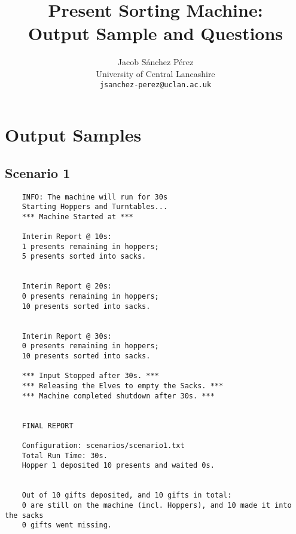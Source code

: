 \documentclass[a4paper,12pt]{article}
\title{Present Sorting Machine: \\Output Sample and Questions}
\author{Jacob Sánchez Pérez\\ University of Central Lancashire\\\texttt{jsanchez-perez@uclan.ac.uk}}
\date{}
\begin{document}
    \maketitle
    \section{Output Samples}
    
    \subsection{Scenario 1}
    
    \begin{verbatim}
    INFO: The machine will run for 30s
    Starting Hoppers and Turntables...
    *** Machine Started at ***

    Interim Report @ 10s:
    1 presents remaining in hoppers;
    5 presents sorted into sacks.


    Interim Report @ 20s:
    0 presents remaining in hoppers;
    10 presents sorted into sacks.


    Interim Report @ 30s:
    0 presents remaining in hoppers;
    10 presents sorted into sacks.

    *** Input Stopped after 30s. ***
    *** Releasing the Elves to empty the Sacks. ***
    *** Machine completed shutdown after 30s. ***


    FINAL REPORT

    Configuration: scenarios/scenario1.txt
    Total Run Time: 30s.
    Hopper 1 deposited 10 presents and waited 0s.


    Out of 10 gifts deposited, and 10 gifts in total:
    0 are still on the machine (incl. Hoppers), and 10 made it into the sacks
    0 gifts went missing.
    \end{verbatim}
\end{document}
